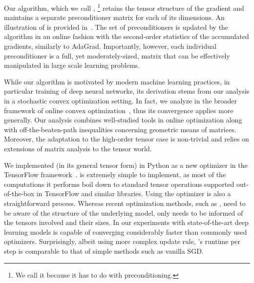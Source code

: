 Our algorithm, which we call \NAME,%
\footnote{We call it \NAME because it has to do with preconditioning.}
retains the tensor
structure of the gradient and maintains a separate preconditioner matrix for
each of its dimensions. An illustration of \NAME is provided
in~. The set of preconditioners is updated by the algorithm
in an online fashion with the second-order statistics of the accumulated
gradients, similarly to AdaGrad.  Importantly, however, each individual
preconditioner is a full, yet moderately-sized, matrix that can be effectively
manipulated in large scale learning problems. 

While our algorithm is motivated by modern machine learning practices, in
particular training of deep neural networks, its derivation stems from our
analysis in a stochastic convex optimization setting.  In fact, we analyze
\NAME in the broader framework of online convex
optimization~\cite{shalev2012online, hazan2016introduction}, thus its
convergence applies more generally. Our analysis combines well-studied tools
in online optimization along with off-the-beaten-path inequalities concerning
geometric means of matrices. Moreover, the adaptation to the high-order tensor
case is non-trivial and relies on extensions of matrix analysis to the tensor
world.

We implemented \NAME (in its general tensor form) in Python as a new optimizer
in the TensorFlow framework~\citep{tensorflow}.  \NAME is extremely simple to
implement, as most of the computations it performs boil down to standard
tensor operations supported out-of-the-box in TensorFlow and similar
libraries. Using the \NAME optimizer is also a straightforward process.
Whereas recent optimization methods, such as \cite{martens2015optimizing,
neyshabur2015path}, need to be aware of the structure of the underlying model,
\NAME only needs to be informed of the tensors involved and their sizes.  In
our experiments with state-of-the-art deep learning models \NAME is capable of
converging considerably faster than commonly used optimizers.  Surprisingly,
albeit using more complex update rule, \NAME's runtime per step is comparable
to that of simple methods such as vanilla SGD.


